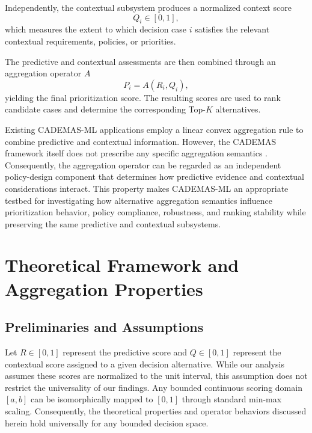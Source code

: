 \documentclass[mathematics,article,submit,moreauthors]{Definitions/mdpi}
\begin{document}
Independently, the contextual subsystem produces a normalized context
score
\begin{equation}
Q_i \in [0,1],
\end{equation}
which measures the extent to which decision case $i$ satisfies the
relevant contextual requirements, policies, or priorities.

The predictive and contextual assessments are then combined through an
aggregation operator $A$
\begin{equation}
P_i = A(R_i,Q_i),
\end{equation}
yielding the final prioritization score. The resulting scores are used
to rank candidate cases and determine the corresponding Top-$K$
alternatives.

Existing CADEMAS-ML applications employ a linear convex aggregation rule
to combine predictive and contextual information. However, the CADEMAS
framework itself does not prescribe any specific aggregation semantics
\citep{NovoaHernandez2026}. Consequently, the aggregation operator can
be regarded as an independent policy-design component that determines
how predictive evidence and contextual considerations interact. This
property makes CADEMAS-ML an appropriate testbed for investigating how
alternative aggregation semantics influence prioritization behavior,
policy compliance, robustness, and ranking stability while preserving
the same predictive and contextual subsystems.


\section{Theoretical Framework and Aggregation Properties}

\subsection{Preliminaries and Assumptions}

Let $R \in [0,1]$ represent the predictive score and $Q \in [0,1]$ represent the contextual score assigned to a given decision alternative. While our analysis assumes these scores are normalized to the unit interval, this assumption does not restrict the universality of our findings. Any bounded continuous scoring domain $[a,b]$ can be isomorphically mapped to $[0,1]$ through standard min-max scaling. Consequently, the theoretical properties and operator behaviors discussed herein hold universally for any bounded decision space.
\end{document}
